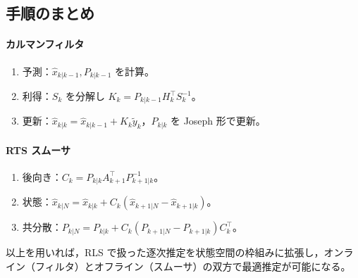 \subsection{手順のまとめ}
\paragraph{カルマンフィルタ}
\begin{enumerate}\setlength{\itemsep}{2pt}
  \item 予測：$\hat x_{k|k-1},P_{k|k-1}$ を計算。
  \item 利得：$S_k$ を分解し $K_k=P_{k|k-1}H_k^\top S_k^{-1}$。
  \item 更新：$\hat x_{k|k}=\hat x_{k|k-1}+K_k\tilde y_k$，$P_{k|k}$ を Joseph 形で更新。
\end{enumerate}

\paragraph{RTS スムーサ}
\begin{enumerate}\setlength{\itemsep}{2pt}
  \item 後向き：$C_k=P_{k|k}A_{k+1}^\top P_{k+1|k}^{-1}$。
  \item 状態：$\hat x_{k|N}=\hat x_{k|k}+C_k(\hat x_{k+1|N}-\hat x_{k+1|k})$。
  \item 共分散：$P_{k|N}=P_{k|k}+C_k(P_{k+1|N}-P_{k+1|k})C_k^\top$。
\end{enumerate}
\medskip

以上を用いれば，RLS で扱った逐次推定を状態空間の枠組みに拡張し，オンライン（フィルタ）とオフライン（スムーサ）の双方で最適推定が可能になる。\cite{exp2025}
